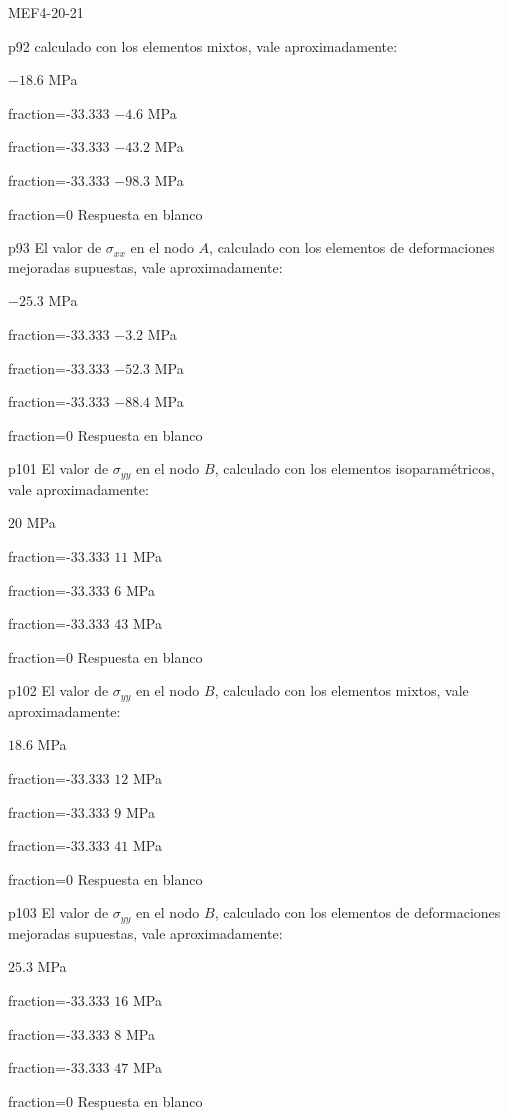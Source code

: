 \documentclass[a4paper]{article}
\begin{document}
\begin{quiz}{MEF4-20-21}
\begin{multi}{p92}
	calculado con los elementos mixtos, vale aproximadamente:
	\item* $-18.6$ MPa
	\item[fraction=-33.333] $-4.6$ MPa
	\item[fraction=-33.333] $-43.2$ MPa
	\item[fraction=-33.333] $-98.3$ MPa
	\item[fraction=0] Respuesta en blanco
\end{multi}
\begin{multi}{p93}
	El valor de $\sigma_{xx}$ en el nodo $A$,
	calculado con los elementos de deformaciones mejoradas supuestas,
	vale aproximadamente:
	\item* $-25.3$ MPa
	\item[fraction=-33.333] $-3.2$ MPa
	\item[fraction=-33.333] $-52.3$ MPa
	\item[fraction=-33.333] $-88.4$ MPa
	\item[fraction=0] Respuesta en blanco
\end{multi}
\begin{multi}{p101}
	El valor de $\sigma_{yy}$ en el nodo $B$,
	calculado con los elementos isoparam\'etricos, vale aproximadamente:
	\item* $20$ MPa
	\item[fraction=-33.333] $11$ MPa
	\item[fraction=-33.333] $6$ MPa
	\item[fraction=-33.333] $43$ MPa
	\item[fraction=0] Respuesta en blanco
\end{multi}
\begin{multi}{p102}
	El valor de $\sigma_{yy}$ en el nodo $B$,
	calculado con los elementos mixtos, vale aproximadamente:
	\item* $18.6$ MPa
	\item[fraction=-33.333] $12$ MPa
	\item[fraction=-33.333] $9$ MPa
	\item[fraction=-33.333] $41$ MPa
	\item[fraction=0] Respuesta en blanco
\end{multi}
\begin{multi}{p103}
	El valor de $\sigma_{yy}$ en el nodo $B$,
	calculado con los elementos de deformaciones mejoradas supuestas,
	vale aproximadamente:
	\item* $25.3$ MPa
	\item[fraction=-33.333] $16$ MPa
	\item[fraction=-33.333] $8$ MPa
	\item[fraction=-33.333] $47$ MPa
	\item[fraction=0] Respuesta en blanco
\end{multi}

\end{quiz}
\end{document}
